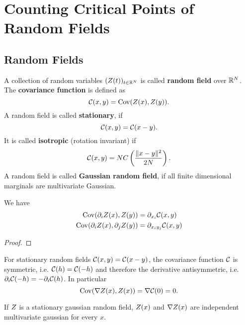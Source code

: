 \section{Counting Critical Points of Random Fields}

\subsection{Random Fields}

\begin{definition}
	A collection of random variables \((Z(t))_{t\in\mathbb{R}^N}\) is called
	\textbf{random field} over \(\mathbb{R}^N\). The \textbf{covariance function}
	is defined as
	\begin{equation*}
		\mathcal{C}(x,y) = \operatorname{Cov}(Z(x), Z(y)).
	\end{equation*}
	A random field is called \textbf{stationary}, if
	\begin{equation*}
		\mathcal{C}(x,y) = \mathcal{C}(x-y).
	\end{equation*}
	It is called \textbf{isotropic} (rotation invariant) if	
	\begin{equation*}
		\mathcal{C}(x,y) = N C\left(\frac{\|x-y\|^2}{2N}\right).
	\end{equation*}
	A random field is called \textbf{Gaussian random field}, if all finite
	dimensional marginals are multivariate Gaussian.
\end{definition}

\begin{lemma}
	\label{lem: covariance of derivative}
	We have
	\begin{align*}
		\operatorname{Cov}(\partial_iZ(x), Z(y)) &= \partial_{x_i} \mathcal{C}(x,y)\\
		\operatorname{Cov}(\partial_iZ(x), \partial_j Z(y)) &= \partial_{x_i y_j} \mathcal{C}(x,y)
	\end{align*}
\end{lemma}
\begin{proof}
\end{proof}
\begin{remark}\label{rem: covariance uncorrelated}
	For stationary random fields \(\mathcal{C}(x,y)=\mathcal{C}(x-y)\), the covariance
	function \(\mathcal{C}\) is symmetric, i.e. \(\mathcal{C}(h)=\mathcal{C}(-h)\)
	and therefore the derivative antisymmetric, i.e.
	\(\partial_i\mathcal{C}(-h)=-\partial_i\mathcal{C}(h)\). In particular
	\begin{equation*}
		\operatorname{Cov}(\nabla Z(x), Z(x)) = \nabla \mathcal{C}(0)=0.
	\end{equation*}
\end{remark}
\begin{corollary} \label{cor: uncorr leads to indep in gaussian case}
	If \(Z\) is a stationary gaussian random field, \(Z(x)\) and
	\(\nabla Z(x)\) are independent multivariate gaussian for every \(x\).
\end{corollary}

